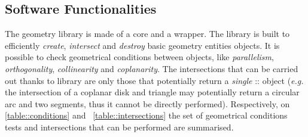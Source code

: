 \subsection{Software Functionalities}
The \Acme{} geometry library is made of a \cpp{} core and a \Matlab{} \Mex{} wrapper. The library is built to efficiently \emph{create}, \emph{intersect} and \emph{destroy} basic geometry entities objects. It is possible to check geometrical conditions between objects, like \emph{parallelism}, \emph{orthogonality}, \emph{collinearity} and \emph{coplanarity}. The intersections that can be carried out thanks to \Acme{} library are only those that potentially return a \emph{single} \Acme{}::\Entity{} object (\emph{e.g.} the intersection of a coplanar disk and triangle may potentially return a circular arc and two segments, thus it cannot be directly performed). Respectively, on \tablename{} \ref{table::conditions} and \tablename{}~\ref{table::intersections} the set of geometrical conditions tests and intersections that can be performed are summarised.

